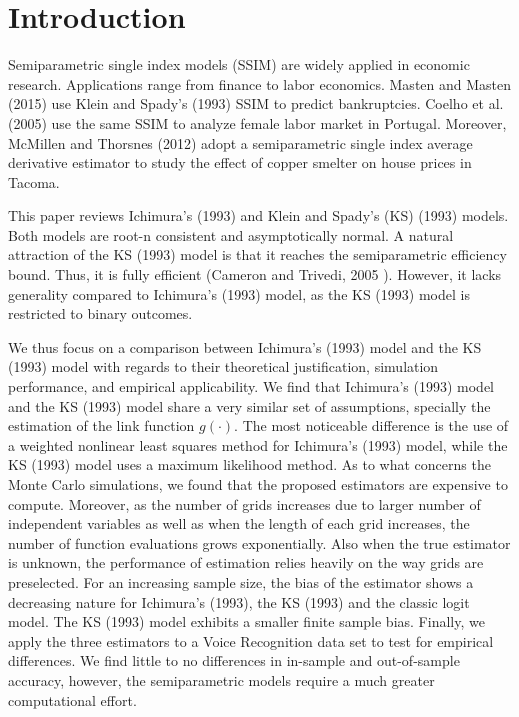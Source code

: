 \documentclass[a4paper]{article}
\begin{document}
\newpage
	
\section{Introduction} %
\label{sec:introduction}

Semiparametric single index models (SSIM) are widely applied in economic research. Applications range from finance to labor economics. Masten and Masten (2015) \cite{[30]} use Klein and Spady's (1993) \cite{[12]} SSIM to predict bankruptcies. Coelho et al. (2005) \cite{[29]} use the same SSIM to analyze female labor market in Portugal. Moreover, McMillen and Thorsnes (2012) \cite{[31]} adopt a semiparametric single index average derivative estimator to study the effect of copper smelter on house prices in Tacoma.

This paper reviews Ichimura's (1993) \cite{[6]} and Klein and Spady's (KS) (1993) \cite{[12]} models. Both models are root-n consistent and asymptotically normal. A natural attraction of the KS (1993) \cite{[12]} model is that it reaches the semiparametric efficiency bound. Thus, it is fully efficient  (Cameron and Trivedi, 2005 \cite{[5]}). However, it lacks generality compared to Ichimura's (1993) \cite{[6]} model, as the KS (1993) \cite{[12]} model is restricted to binary outcomes.

We thus focus on a comparison between Ichimura's (1993) \cite{[6]} model and the KS (1993) \cite{[12]} model with regards to their theoretical justification, simulation performance, and empirical applicability. We find that Ichimura's (1993) \cite{[6]} model and the KS (1993) \cite{[12]} model share a very similar set of assumptions, specially the estimation of the link function $g(\cdot)$. The most noticeable difference is the use of a weighted nonlinear least squares method for Ichimura's (1993) \cite{[6]} model, while the KS (1993) \cite{[12]} model uses a maximum likelihood method. As to what concerns the Monte Carlo simulations, we found that the proposed estimators are expensive to compute. Moreover, as the number of grids increases due to larger number of independent variables as well as when the length of each grid increases, the number of function evaluations grows exponentially. Also when the true estimator is unknown, the performance of estimation relies heavily on the way grids are preselected. For an increasing sample size, the bias of the estimator shows a decreasing nature for Ichimura's (1993)\cite{[12]}, the KS (1993) and the classic logit model. The KS (1993) \cite{[12]} model exhibits a smaller finite sample bias. Finally, we apply the three estimators to a Voice Recognition data set to test for empirical differences. We find little to no differences in in-sample and out-of-sample accuracy, however, the semiparametric models require a much greater computational effort. 
\end{document}
